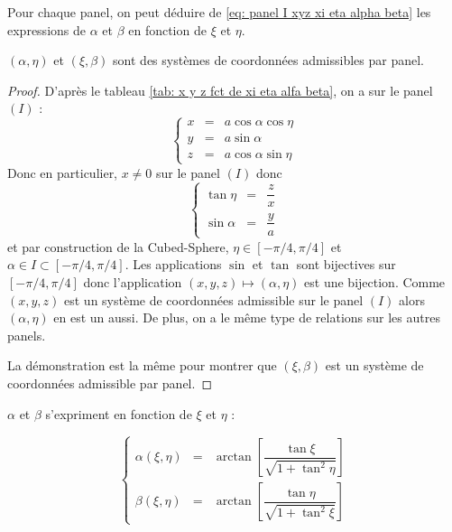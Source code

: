 Pour chaque panel, on peut déduire de \eqref{eq: panel I xyz xi eta alpha beta} les expressions de $\alpha$ et $\beta$ en fonction de $\xi$ et $\eta$. 

\begin{theoreme}
$(\alpha, \eta)$ et $(\xi, \beta)$ sont des systèmes de coordonnées admissibles par panel.
\end{theoreme} 

\begin{proof}
D'après le tableau \ref{tab: x y z fct de xi eta alfa beta}, on a sur le panel $(I)$ :
\begin{equation}
\left\lbrace
\begin{array}{rcl}
x & = & a \cos \alpha \cos \eta \\
y & = & a \sin \alpha \\
z & = & a \cos \alpha \sin \eta
\end{array}
\right.
\end{equation}
Donc en particulier, $x \neq 0$ sur le panel $(I)$ donc
\begin{equation}
\left\lbrace
\begin{array}{rcl}
\tan \eta & = & \dfrac{z}{x} \\
\sin \alpha & = & \dfrac{y}{a}
\end{array}
\right.
\end{equation}
et par construction de la Cubed-Sphere, $\eta \in [- \pi/4, \pi/4]$ et $\alpha \in I \subset[- \pi/4, \pi/4]$. Les applications $\sin$ et $\tan$ sont bijectives sur $[- \pi/4, \pi/4]$ donc l'application $(x,y,z) \mapsto (\alpha, \eta)$ est une bijection. Comme $(x,y,z)$ est un système de coordonnées admissible sur le panel $(I)$ alors $(\alpha, \eta)$ en est un aussi. De plus, on a le même type de relations sur les autres panels.

La démonstration est la même pour montrer que $(\xi, \beta)$ est un système de coordonnées admissible par panel.
\end{proof}


\begin{proposition}
$\alpha$ et $\beta$ s'expriment en fonction de $\xi$ et $\eta$ :

\begin{equation}
\left\lbrace
\begin{array}{rcl}
\alpha(\xi, \eta) & = & \arctan \left[ \dfrac{\tan \xi}{\sqrt{1+\tan^2 \eta}} \right] \\
\beta(\xi,\eta) & = & \arctan \left[ \dfrac{\tan \eta}{\sqrt{1+\tan^2 \xi}} \right] 
\end{array}
\right.
\label{eq: alpha et beta fct de xi et eta}
\end{equation}
\end{proposition}

